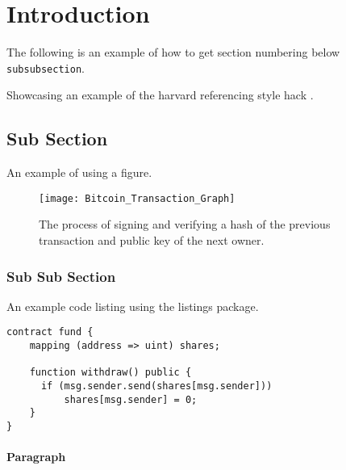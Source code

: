 \documentclass[dissertation.tex]{subfiles}
\begin{document}
\section{Introduction}
	The following is an example of how to get section numbering below \verb|subsubsection|.
	
	Showcasing an example of the harvard referencing style hack \citep{chaum1989}.
	\subsection{Sub Section}
	An example of using a figure.
	\begin{figure}[!h]
	\centering
	\texttt{[image: Bitcoin\_Transaction\_Graph]}
	\caption[Bitcoin Transaction Process]{The process of signing and verifying a hash of the previous transaction and public key of the next owner.}

	\end{figure}

	\subsubsection{Sub Sub Section}
 An example code listing using the listings package. 

\begin{lstlisting}[caption=Re-Entrancy Contract - Using Send]
contract fund {
	mapping (address => uint) shares;
	
	function withdraw() public {
	  if (msg.sender.send(shares[msg.sender]))
	  	  shares[msg.sender] = 0;
	}
}
\end{lstlisting}
	\paragraph{Paragraph}\mbox{}\\
\end{document}
